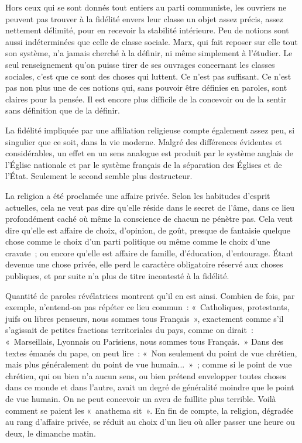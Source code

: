 \documentclass[french,twoside]{book} %
\begin{document}
Hors ceux qui se sont donnés tout entiers au parti communiste, les ouvriers ne peuvent pas trouver à la fidélité envers leur classe un objet assez précis, assez nettement délimité, pour en recevoir la stabilité intérieure. Peu de notions sont aussi indéterminées que celle de classe sociale. Marx, qui fait reposer sur elle tout son système, n'a jamais cherché à la définir, ni même simplement à l'étudier. Le seul renseignement qu'on puisse tirer de ses ouvrages concernant les classes sociales, c'est que ce sont des choses qui luttent. Ce n'est pas suffisant. Ce n'est pas non plus une de ces notions qui, sans pouvoir être définies en paroles, sont claires pour la pensée. Il est encore plus difficile de la concevoir ou de la sentir sans définition que de la définir.\par
La fidélité impliquée par une affiliation religieuse compte également assez peu, si singulier que ce soit, dans la vie moderne. Malgré des différences évidentes et considérables, un effet en un sens analogue est produit par le système anglais de l'Église nationale et par le système français de la séparation des Églises et de l'État. Seulement le second semble plus destructeur.\par
La religion a été proclamée une affaire privée. Selon les habitudes d'esprit actuelles, cela ne veut pas dire qu'elle réside dans le secret de l'âme, dans ce lieu profondément caché où même la conscience de chacun ne pénètre pas. Cela veut dire qu'elle est affaire de choix, d'opinion, de goût, presque de fantaisie quelque chose comme le choix d'un parti politique ou même comme le choix d'une cravate ; ou encore qu'elle est affaire de famille, d'éducation, d'entourage. Étant devenue une chose privée, elle perd le caractère obligatoire réservé aux choses publiques, et par suite n’a plus de titre incontesté à la fidélité.\par
Quantité de paroles révélatrices montrent qu'il en est ainsi. Combien de fois, par exemple, n'entend-on pas répéter ce lieu commun : « Catholiques, protestants, juifs ou libres penseurs, nous sommes tous Français », exactement comme s'il s'agissait de petites fractions territoriales du pays, comme on dirait : « Marseillais, Lyonnais ou Parisiens, nous sommes tous Français. » Dans des textes émanés du pape, on peut lire : « Non seulement du point de vue chrétien, mais plus généralement du point de vue humain... » ; comme si le point de vue chrétien, qui ou bien n'a aucun sens, ou bien prétend envelopper toutes choses dans ce monde et dans l'autre, avait un degré de généralité moindre que le point de vue humain. On ne peut concevoir un aveu de faillite plus terrible. Voilà comment se paient les « anathema sit ». En fin de compte, la religion, dégradée au rang d'affaire privée, se réduit au choix d'un lieu où aller passer une heure ou deux, le dimanche matin.\par
\end{document}
